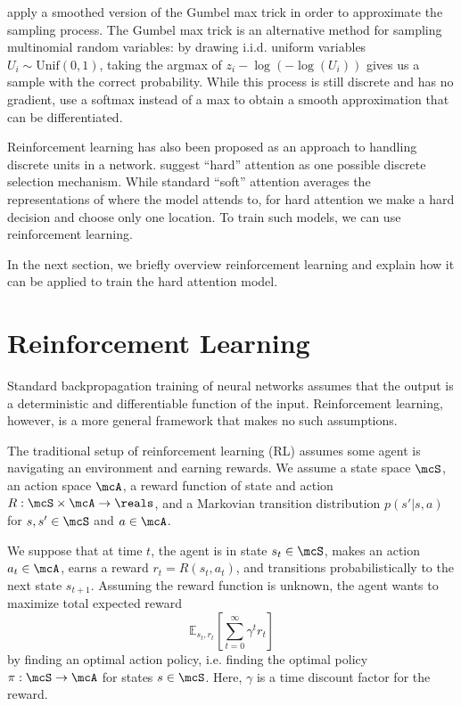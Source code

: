 \documentclass[12pt]{report}
\begin{document}
\citet{Maddison2017} apply a smoothed version of the Gumbel max trick in order to approximate the sampling process. The Gumbel max trick is an alternative method for sampling multinomial random variables: by drawing i.i.d. uniform variables $U_i \sim \mathrm{Unif}(0,1)$, taking the argmax of $z_i - \log(-\log(U_i))$ gives us a sample with the correct probability. While this process is still discrete and has no gradient, \citet{Maddison2017} use a softmax instead of a max to obtain a smooth approximation that can be differentiated.


Reinforcement learning has also been proposed as an approach to handling discrete units in a network.
\citet{xu2015captioning} suggest ``hard'' attention as one possible discrete selection mechanism. While standard ``soft'' attention averages the representations of where the model attends to, for hard attention we make a hard decision and choose only one location. To train such models, we can use reinforcement learning.

In the next section, we briefly overview reinforcement learning and explain how it can be applied to train the hard attention model.


\section{Reinforcement Learning}

Standard backpropagation training of neural networks assumes that the output is a deterministic and differentiable function of the input. Reinforcement learning, however, is a more general framework that makes no such assumptions.

The traditional setup of reinforcement learning (RL) assumes some agent is navigating an environment and earning rewards.
We assume a state space $\mcS$, an action space $\mcA$, a reward function of state and action $R : \mcS \times \mcA \to \reals$, and a Markovian transition distribution $p(s' | s, a)$ for $s, s' \in \mcS$ and $a \in \mcA$.

We suppose that at time $t$, the agent is in state $s_t \in \mcS$, makes an action $a_t \in \mcA$, earns a reward $r_t = R(s_t, a_t)$, and transitions probabilistically to the next state $s_{t+1}$.
Assuming the reward function is unknown, the agent wants to maximize total expected reward
$$\mathbb{E}_{s_t, r_t} [\sum_{t=0}^\infty \gamma^t r_t]$$
by finding an optimal action policy, i.e. finding the optimal policy $\pi : \mcS \to \mcA$ for states $s \in \mcS$. Here, $\gamma$ is a time discount factor for the reward.
\end{document}
